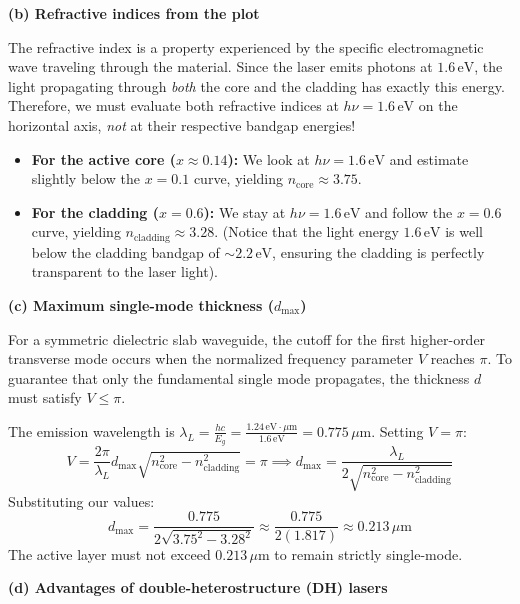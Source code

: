\textbf{(b) Refractive indices from the plot}

The refractive index is a property experienced by the specific electromagnetic wave traveling through the material. Since the laser emits photons at $1.6\,\text{eV}$, the light propagating through \textit{both} the core and the cladding has exactly this energy. Therefore, we must evaluate both refractive indices at $h\nu = 1.6\,\text{eV}$ on the horizontal axis, \textit{not} at their respective bandgap energies!

\begin{itemize}
    \item \textbf{For the active core ($x \approx 0.14$):} We look at $h\nu = 1.6\,\text{eV}$ and estimate slightly below the $x=0.1$ curve, yielding $n_{\text{core}} \approx 3.75$.
    \item \textbf{For the cladding ($x = 0.6$):} We stay at $h\nu = 1.6\,\text{eV}$ and follow the $x=0.6$ curve, yielding $n_{\text{cladding}} \approx 3.28$. (Notice that the light energy $1.6\,\text{eV}$ is well below the cladding bandgap of $\sim 2.2\,\text{eV}$, ensuring the cladding is perfectly transparent to the laser light).
\end{itemize}

\textbf{(c) Maximum single-mode thickness ($d_{\text{max}}$)}

For a symmetric dielectric slab waveguide, the cutoff for the first higher-order transverse mode occurs when the normalized frequency parameter $V$ reaches $\pi$. To guarantee that only the fundamental single mode propagates, the thickness $d$ must satisfy $V \le \pi$.

The emission wavelength is $\lambda_L = \frac{hc}{E_g} = \frac{1.24\,\text{eV}\cdot\mu\text{m}}{1.6\,\text{eV}} = 0.775\,\mu\text{m}$.
Setting $V = \pi$:
\begin{equation*}
  V = \frac{2\pi}{\lambda_L} d_{\text{max}} \sqrt{n_{\text{core}}^2 - n_{\text{cladding}}^2} = \pi \implies d_{\text{max}} = \frac{\lambda_L}{2\sqrt{n_{\text{core}}^2 - n_{\text{cladding}}^2}}
\end{equation*}
Substituting our values:
\begin{equation*}
  d_{\text{max}} = \frac{0.775}{2\sqrt{3.75^2 - 3.28^2}} \approx \frac{0.775}{2(1.817)} \approx 0.213\,\mu\text{m}
\end{equation*}
The active layer must not exceed $0.213\,\mu\text{m}$ to remain strictly single-mode.

\textbf{(d) Advantages of double-heterostructure (DH) lasers}


